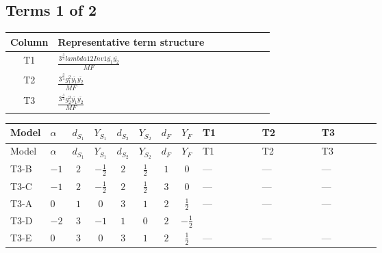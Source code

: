 \documentclass[8pt]{article}
\begin{document}
\begin{landscape}
\subsection*{Terms 1 of 2}
\begin{center}
\begin{tabular}{@{}c >{\raggedright\arraybackslash}p{0.82\linewidth}@{}}
\toprule
Column & Representative term structure \\
\midrule
T1 & \(\displaystyle \frac{3^{\frac{3}{4}} lambda12Inv1 \overline{y_{1}} \overline{y_{2}}}{MF}\) \\
\midrule
T2 & \(\displaystyle \frac{3^{\frac{3}{4}} g_{1}^{2} \overline{y_{1}} \overline{y_{2}}}{MF}\) \\
\midrule
T3 & \(\displaystyle \frac{3^{\frac{3}{4}} g_{2}^{2} \overline{y_{1}} \overline{y_{2}}}{MF}\) \\
\midrule
\bottomrule
\end{tabular}
\end{center}
\smallskip
\tiny
\begin{longtable}{@{}llcccccc >{\raggedright\arraybackslash}p{0.21\linewidth} >{\raggedright\arraybackslash}p{0.21\linewidth} >{\raggedright\arraybackslash}p{0.21\linewidth}@{}}
\toprule
Model & $\alpha$ & $d_{S_1}$ & $Y_{S_1}$ & $d_{S_2}$ & $Y_{S_2}$ & $d_F$ & $Y_F$ & T1 & T2 & T3 \\
\midrule
\endfirsthead
\toprule
Model & $\alpha$ & $d_{S_1}$ & $Y_{S_1}$ & $d_{S_2}$ & $Y_{S_2}$ & $d_F$ & $Y_F$ & T1 & T2 & T3 \\
\midrule
\endhead
T3-B & $-1$ & $2$ & $-\frac{1}{2}$ & $2$ & $\frac{1}{2}$ & $1$ & $0$ & --- & --- & --- \\
\midrule
T3-C & $-1$ & $2$ & $-\frac{1}{2}$ & $2$ & $\frac{1}{2}$ & $3$ & $0$ & --- & --- & --- \\
\midrule
T3-A & $0$ & $1$ & $0$ & $3$ & $1$ & $2$ & $\frac{1}{2}$ & --- & --- & --- \\
\midrule
T3-D & $-2$ & $3$ & $-1$ & $1$ & $0$ & $2$ & $-\frac{1}{2}$ & \scriptsize\adjustbox{max width=\linewidth}{$\begin{gathered} \frac{3^{\frac{3}{4}} lambda12Inv1 \overline{y_{1}} \overline{y_{2}}}{6 MF}\end{gathered}$} & \scriptsize\adjustbox{max width=\linewidth}{$\begin{gathered} \frac{3^{\frac{3}{4}} g_{1}^{2} \overline{y_{1}} \overline{y_{2}}}{8 MF}\end{gathered}$} & \scriptsize\adjustbox{max width=\linewidth}{$\begin{gathered} \frac{11 \cdot 3^{\frac{3}{4}} g_{2}^{2} \overline{y_{1}} \overline{y_{2}}}{8 MF}\end{gathered}$} \\
\midrule
T3-E & $0$ & $3$ & $0$ & $3$ & $1$ & $2$ & $\frac{1}{2}$ & --- & --- & --- \\
\midrule
\bottomrule
\end{longtable}
\clearpage

\end{landscape}
\end{document}
